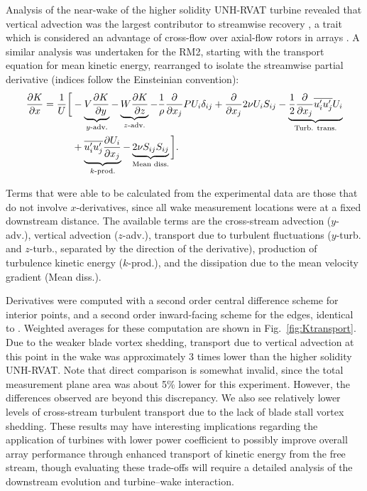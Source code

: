 \documentclass[10pt,letterpaper]{article}
\def \p{\partial}
\begin{document}
Analysis of the near-wake of the higher solidity UNH-RVAT turbine revealed that
vertical advection was the largest contributor to streamwise recovery
\cite{Bachant2015-JoT}, a trait which is considered an advantage of cross-flow
over axial-flow rotors in arrays \cite{Kinzel2012}. A similar analysis was
undertaken for the RM2, starting with the transport equation for mean kinetic
energy, rearranged to isolate the streamwise partial derivative (indices follow
the Einsteinian convention):
\begin{equation}
    \begin{split}
        \frac{\p K}{\p x}
        =
        \frac{1}{U}
        \bigg{[}
        & - \underbrace{V \frac{\p K}{\p y}}_{y\text{-adv.}}
        - \underbrace{W \frac{\p K}{\p z}}_{z\text{-adv.}}
        - \frac{1}{\rho}\frac{\p}{\p x_j} P U_i \delta_{ij}
        + \frac{\p}{\p x_j} 2 \nu U_i S_{ij}
        - \underbrace{
            \frac{1}{2}\frac{\p}{\p x_j} \overline{u_i' u_j'} U_i
        }_{\text{Turb. trans.}} \\
        & + 
        \underbrace{
            \overline{u_i' u_j'} \frac{\p U_i}{\p x_j}
        }_{k\text{-prod.}}
        - 
        \underbrace{
            2 \nu S_{ij}S_{ij}
        }_{\text{Mean diss.}}
        \bigg{]}.
    \end{split}
    \label{eq:K-full}
\end{equation}

Terms that were able to be calculated from the experimental data are those that
do not involve $x$-derivatives, since all wake measurement locations were at a
fixed downstream distance. The available terms are the cross-stream advection
($y$-adv.), vertical advection ($z$-adv.), transport due to turbulent
fluctuations ($y$-turb. and $z$-turb., separated by the direction of the
derivative), production of turbulence kinetic energy ($k$-prod.), and the
dissipation due to the mean velocity gradient (Mean diss.).

Derivatives were computed with a second order central difference scheme for
interior points, and a second order inward-facing scheme for the edges,
identical to \cite{Bachant2015-JoT}. Weighted averages for these computation are
shown in Fig.~\ref{fig:Ktransport}. Due to the weaker blade vortex shedding,
transport due to vertical advection at this point in the wake was approximately
3 times lower than the higher solidity UNH-RVAT. Note that direct comparison is
somewhat invalid, since the total measurement plane area was about 5\% lower for
this experiment. However, the differences observed are beyond this discrepancy.
We also see relatively lower levels of cross-stream turbulent transport due to
the lack of blade stall vortex shedding. These results may have interesting
implications regarding the application of turbines with lower power coefficient
to possibly improve overall array performance through enhanced transport of
kinetic energy from the free stream, though evaluating these trade-offs will
require a detailed analysis of the downstream evolution and turbine--wake
interaction.
\end{document}
